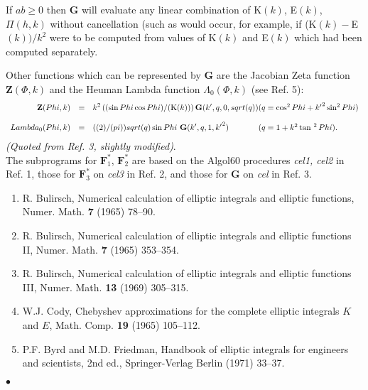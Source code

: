 If $ab \ge 0$ then $\mathbf{G}$ will evaluate any linear
combination of K$(k)$, E$(k)$, $\Pi(h,k)$ without cancellation
(such as would occur, for example, if (K$(k)-$E$(k))/k^2$ were to be
computed from values of K$(k)$ and E$(k)$ which had been computed
separately.
\par
Other functions which can be represented by $\mathbf{G}$ are the Jacobian
Zeta function $\mathbf{Z}(\Phi,k)$ and the Heuman Lambda function
$\Lambda_0(\Phi,k)$ (see Ref. 5):
$$\begin{array}{rcl@{\qquad}l}
\mathbf{Z}(\Phi,k) & = & \displaystyle k^2 \,
\frac{\sin \Phi \cos \Phi}{\mathrm{K}(k)} \, \mathbf{G}(k',q,0,\sqrt{q})
& (q = \cos^2 \Phi + {k'}^2 \sin^2 \Phi) \\[4mm]
\Lambda_0(\Phi,k) & = & \displaystyle \frac{2}{\pi}
\sqrt{q} \sin \Phi \ \mathbf{G}(k',q,1,{k'}^2) &
(q = 1 + k^2 \tan^2 \Phi).
\end{array} $$
{\it (Quoted from Ref. 3, slightly modified)}.\\
\newpage
\Source
The subprograms for $\mathbf{F}_1^*$, $\mathbf{F}_2^*$ are based on the
Algol60 procedures {\it cel1, cel2} in Ref. 1, those for
$\mathbf{F}_3^*$ on {\it cel3} in Ref. 2, and those for $\mathbf{G}$
on {\it cel} in Ref. 3.
\Refer
\begin{enumerate}
\item R. Bulirsch, Numerical calculation of elliptic integrals and
elliptic functions, Numer. Math. {\bf 7} (1965) 78--90.
\item R. Bulirsch, Numerical calculation of elliptic integrals and
elliptic functions II, Numer. Math. {\bf 7} (1965) 353--354.
\item R. Bulirsch, Numerical calculation of elliptic integrals and
elliptic functions III, Numer. Math. {\bf 13} (1969) 305--315.
\item W.J. Cody, Chebyshev approximations for the complete elliptic
integrals $K$ and $E$, Math. Comp. {\bf 19} (1965) 105--112.
\item P.F. Byrd and M.D. Friedman, Handbook of elliptic integrals
for engineers and scientists, 2nd ed., Springer-Verlag Berlin (1971)
33--37.
\end{enumerate}
$\bullet$
